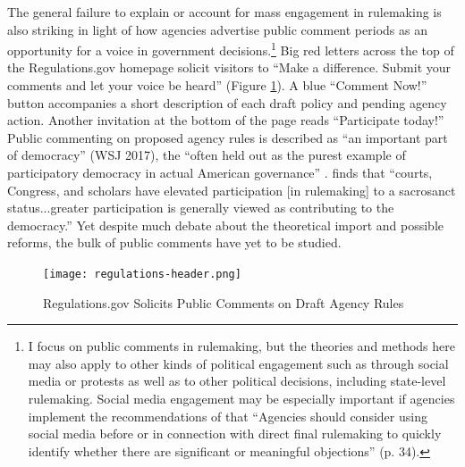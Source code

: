 The general failure to explain or account for mass engagement in rulemaking is also striking in light of how agencies advertise public comment periods as an opportunity for a voice in government decisions.\footnote{
I focus on public comments in rulemaking, but the theories and methods here may also apply to other kinds of political engagement such as through social media or protests as well as to other political decisions, including state-level rulemaking. Social media engagement may be especially important if agencies implement the recommendations of \citet{ACUS2018} that ``Agencies should consider using social media before or in connection with direct final rulemaking to quickly identify whether there are significant or meaningful objections'' (p. 34). 
} 
Big red letters across the top of the Regulations.gov homepage solicit visitors to ``Make a difference. Submit your comments and let your voice be heard'' (Figure \ref{fig:regs.gov}). A blue ``Comment Now!'' button accompanies a short description of each draft policy and pending agency action. 
Another invitation at the bottom of the page reads ``Participate today!''
Public commenting on proposed agency rules is described as ``an important part of democracy'' (WSJ 2017), the ``often held out as the purest example of participatory democracy in actual American governance'' \citep{Herz2016}. \citet{Rossi1997} finds that ``courts, Congress, and scholars have elevated participation [in rulemaking] to a sacrosanct status...greater participation is generally viewed as contributing to the democracy.'' %
Yet despite much debate about the theoretical import and possible reforms, the bulk of public comments have yet to be studied.

\begin{figure}[t]
    \centering
    \caption{Regulations.gov Solicits Public Comments on Draft Agency Rules}
    \label{fig:regs.gov}
    
    \texttt{[image: regulations-header.png]}
\end{figure}

